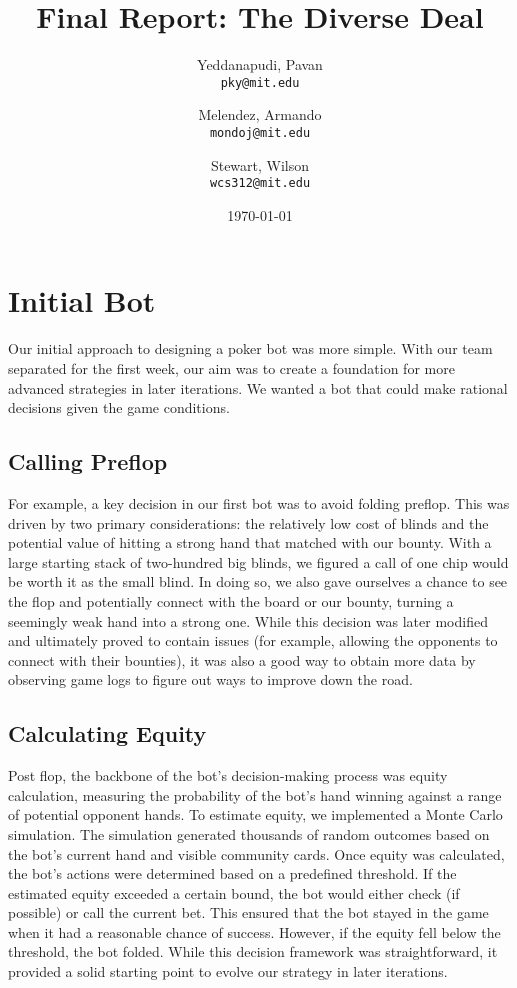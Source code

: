 \documentclass{article}
\title{Final Report: The Diverse Deal}
\date{\today}
\author{
  Yeddanapudi, Pavan\\
  \texttt{pky@mit.edu}
  \and
  Melendez, Armando\\
  \texttt{mondoj@mit.edu}
  \and
  Stewart, Wilson\\
  \texttt{wcs312@mit.edu}
}
\begin{document}
    \maketitle

    \section*{Initial Bot}
    
    Our initial approach to designing a poker bot was more simple. With our team separated for the first week, our aim was to create a foundation for more advanced strategies in later iterations. We wanted a bot that could make rational decisions given the game conditions.
    
    \subsection*{Calling Preflop}
    
    For example, a key decision in our first bot was to avoid folding preflop. This was driven by two primary considerations: the relatively low cost of blinds and the potential value of hitting a strong hand that matched with our bounty. With a large starting stack of two-hundred big blinds, we figured a call of one chip would be worth it as the small blind. In doing so, we also gave ourselves a chance to see the flop and potentially connect with the board or our bounty, turning a seemingly weak hand into a strong one. While this decision was later modified and ultimately proved to contain issues (for example, allowing the opponents to connect with their bounties), it was also a good way to obtain more data by observing game logs to figure out ways to improve down the road.
    
    \subsection*{Calculating Equity}
    Post flop, the backbone of the bot’s decision-making process was equity calculation, measuring the probability of the bot’s hand winning against a range of potential opponent hands. To estimate equity, we implemented a Monte Carlo simulation. The simulation generated thousands of random outcomes based on the bot’s current hand and visible community cards. 
    Once equity was calculated, the bot’s actions were determined based on a predefined threshold. If the estimated equity exceeded a certain bound, the bot would either check (if possible) or call the current bet. This ensured that the bot stayed in the game when it had a reasonable chance of success. However, if the equity fell below the threshold, the bot folded. While this decision framework was straightforward, it provided a solid starting point to evolve our strategy in later iterations.
\end{document}
